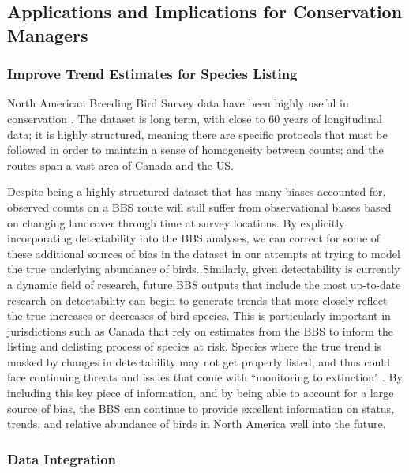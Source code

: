 \subsection{Applications and Implications for Conservation Managers}
\subsubsection{Improve Trend Estimates for Species Listing}

\par North American Breeding Bird Survey data have been highly useful in conservation \citep{hudson_role_2017}.
The dataset is long term, with close to 60 years of longitudinal data; it is highly structured, meaning there are specific protocols that must be followed in order to maintain a sense of homogeneity between counts; and the routes span a vast area of Canada and the US.

\par Despite being a highly-structured dataset that has many biases accounted for, observed counts on a BBS route will still suffer from observational biases based on changing landcover through time at survey locations.
By explicitly incorporating detectability into the BBS analyses, we can correct for some of these additional sources of bias in the dataset in our attempts at trying to model the true underlying abundance of birds.
Similarly, given detectability is currently a dynamic field of research, future BBS outputs that include the most up-to-date research on detectability can begin to generate trends that more closely reflect the true increases or decreases of bird species.
This is particularly important in jurisdictions such as Canada that rely on estimates from the BBS to inform the listing and delisting process of species at risk.
Species where the true trend is masked by changes in detectability may not get properly listed, and thus could face continuing threats and issues that come with ``monitoring to extinction" \citep{martin_acting_2012, lindenmayer_counting_2013}.
By including this key piece of information, and by being able to account for a large source of bias, the BBS can continue to provide excellent information on status, trends, and relative abundance of birds in North America well into the future.

\subsubsection{Data Integration}

